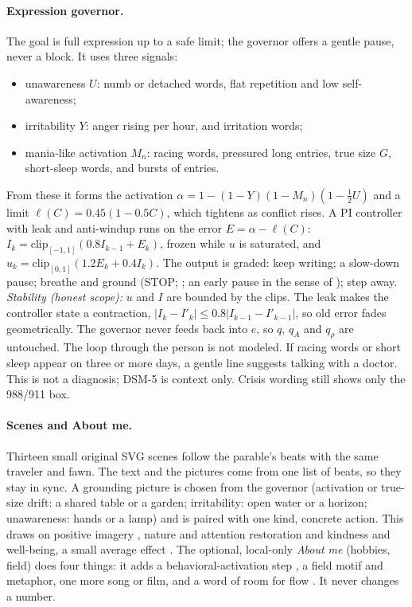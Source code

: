 \documentclass[10pt]{article}
\theoremstyle{remark}
\begin{document}
\paragraph{Expression governor.} The goal is full expression up to a safe limit; the governor offers a gentle pause, never a block. It uses three signals:
\begin{itemize}[itemsep=0pt]
\item unawareness $U$: numb or detached words, flat repetition and low self-awareness;
\item irritability $Y$: anger rising per hour, and irritation words;
\item mania-like activation $M_n$: racing words, pressured long entries, true size $G$, short-sleep words, and bursts of entries.
\end{itemize}
From these it forms the activation $\alpha=1-(1-Y)(1-M_n)(1-\tfrac12U)$ and a limit $\ell(C)=0.45(1-0.5C)$, which tightens as conflict rises. A PI controller with leak and anti-windup \citep{astrom2008} runs on the error $E=\alpha-\ell(C)$: $I_k=\mathrm{clip}_{[-1,1]}(0.8I_{k-1}+E_k)$, frozen while $u$ is saturated, and $u_k=\mathrm{clip}_{[0,1]}(1.2E_k+0.4I_k)$. The output is graded: keep writing; a slow-down pause; breathe and ground (STOP; \citealp{linehan2015}; an early pause in the sense of \citealp{gross1998}); step away. \emph{Stability (honest scope):} $u$ and $I$ are bounded by the clips. The leak makes the controller state a contraction, $|I_k-I'_k|\le0.8|I_{k-1}-I'_{k-1}|$, so old error fades geometrically. The governor never feeds back into $e$, so $q$, $q_A$ and $q_\rho$ are untouched. The loop through the person is not modeled. If racing words or short sleep appear on three or more days, a gentle line suggests talking with a doctor. This is not a diagnosis; DSM-5 \citep{apa2013} is context only. Crisis wording still shows only the 988/911 box.

\paragraph{Scenes and About me.} Thirteen small original SVG scenes follow the parable's beats with the same traveler and fawn. The text and the pictures come from one list of beats, so they stay in sync. A grounding picture is chosen from the governor (activation or true-size drift: a shared table or a garden; irritability: open water or a horizon; unawareness: hands or a lamp) and is paired with one kind, concrete action. This draws on positive imagery \citep{holmes2010}, nature and attention restoration \citep{kaplan1995,berman2008} and kindness and well-being, a small average effect \citep{curry2018}. The optional, local-only \emph{About me} (hobbies, field) does four things: it adds a behavioral-activation step \citep{lewinsohn1974,martell2001}, a field motif and metaphor, one more song or film, and a word of room for flow \citep{csikszentmihalyi1990}. It never changes a number.
\end{document}
